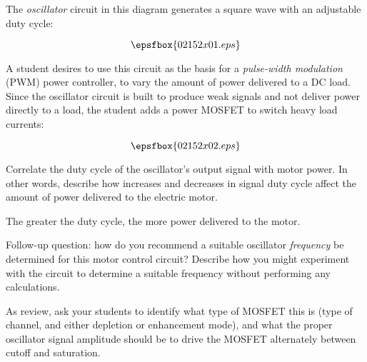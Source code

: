 

The {\it oscillator} circuit in this diagram generates a square wave with an adjustable duty cycle:

$$\epsfbox{02152x01.eps}$$

A student desires to use this circuit as the basis for a {\it pulse-width modulation} (PWM) power controller, to vary the amount of power delivered to a DC load.  Since the oscillator circuit is built to produce weak signals and not deliver power directly to a load, the student adds a power MOSFET to switch heavy load currents:

$$\epsfbox{02152x02.eps}$$

Correlate the duty cycle of the oscillator's output signal with motor power.  In other words, describe how increases and decreases in signal duty cycle affect the amount of power delivered to the electric motor.







The greater the duty cycle, the more power delivered to the motor.

\vskip 10pt

Follow-up question: how do you recommend a suitable oscillator {\it frequency} be determined for this motor control circuit?  Describe how you might experiment with the circuit to determine a suitable frequency without performing any calculations.







As review, ask your students to identify what type of MOSFET this is (type of channel, and either depletion or enhancement mode), and what the proper oscillator signal amplitude should be to drive the MOSFET alternately between cutoff and saturation.




